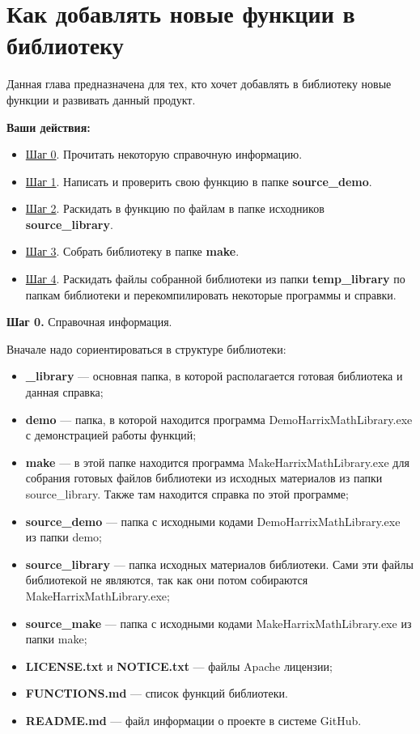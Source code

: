 \newpage
\section{Как добавлять новые функции в библиотеку}\label{section_addnew}

Данная глава предназначена для тех, кто хочет добавлять в библиотеку новые функции и развивать данный продукт.

\textbf{Ваши действия:}

\begin{itemize}
\item \hyperref[step0]{Шаг 0}. Прочитать некоторую справочную информацию.
\item \hyperref[step1]{Шаг 1}. Написать и проверить свою функцию в папке \textbf{source\_demo}.
\item \hyperref[step2]{Шаг 2}. Раскидать в функцию по файлам в папке исходников \textbf{source\_library}.
\item \hyperref[step3]{Шаг 3}. Собрать библиотеку в папке \textbf{make}.
\item \hyperref[step4]{Шаг 4}. Раскидать файлы собранной библиотеки из папки \textbf{temp\_library} по папкам библиотеки и перекомпилировать некоторые программы и справки.
\end{itemize}

\textbf{Шаг 0.} \label{step0} Справочная информация.

Вначале надо сориентироваться в структуре библиотеки:
\begin{itemize}
\item \textbf{\_library} --- основная папка, в которой располагается готовая библиотека и данная справка;
\item \textbf{demo} --- папка, в которой находится программа DemoHarrixMathLibrary.exe с демонстрацией работы функций;
\item \textbf{make} --- в этой папке находится программа MakeHarrixMathLibrary.exe для собрания готовых файлов библиотеки из исходных материалов из папки source\_library. Также там находится справка по этой программе;
\item \textbf{source\_demo} --- папка с исходными кодами DemoHarrixMathLibrary.exe из папки demo;
\item \textbf{source\_library} --- папка исходных материалов библиотеки. Сами эти файлы библиотекой не являются, так как они потом собираются MakeHarrixMathLibrary.exe; 
\item \textbf{source\_make} --- папка с исходными кодами MakeHarrixMathLibrary.exe из папки make;
\item \textbf{LICENSE.txt} и \textbf{NOTICE.txt} --- файлы Apache лицензии;
\item \textbf{FUNCTIONS.md} --- список функций библиотеки.
\item \textbf{README.md} --- файл информации о проекте в системе GitHub.
\end{itemize}

